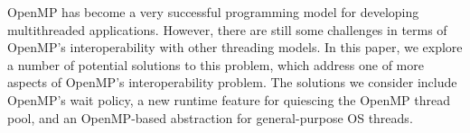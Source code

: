 OpenMP has become a very successful programming model
for developing multithreaded applications.
However, there are still some challenges in terms of OpenMP's interoperability
with other threading models.
In this paper, we explore a number of potential solutions to this problem,
which address one of more aspects of OpenMP's interoperability problem.
The solutions we consider include OpenMP's wait policy,
a new runtime feature for quiescing the OpenMP thread pool,
and an OpenMP-based abstraction for general-purpose OS threads.
